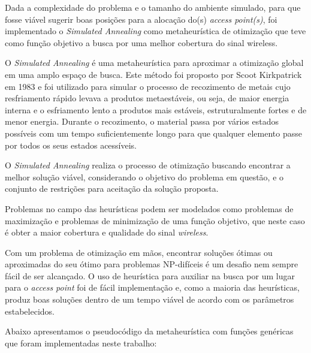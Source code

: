 \documentclass[
	12pt,				%
	openright,			%
	twoside,			%
	a4paper,			%
	english,			%
	french,				%
	spanish,			%
	brazil				%
	]{abntex2}
\begin{document}
Dada a complexidade do problema e o tamanho do ambiente simulado, para que fosse viável sugerir boas posições para a alocação do(s) \textit{access point(s)}, foi implementado o \textit{Simulated Annealing} como metaheurística de otimização que teve como função objetivo a busca por uma melhor cobertura do sinal wireless. 

O \textit{Simulated Annealing} é uma metaheurística para aproximar a otimização global em uma amplo espaço de busca. Este método foi proposto por Scoot Kirkpatrick em 1983 e foi utilizado para simular o processo de recozimento de metais cujo resfriamento  rápido levava a produtos metaestáveis, ou seja, de maior energia interna e o esfriamento lento a produtos mais estáveis, estruturalmente fortes e de menor energia. Durante o recozimento, o material passa por vários estados possíveis com um tempo suficientemente longo para que qualquer elemento passe por todos os seus estados acessíveis.

O \textit{Simulated Annealing} realiza o processo de otimização buscando encontrar a melhor solução viável, considerando o objetivo do problema em questão, e o conjunto de restrições para aceitação da solução proposta.

Problemas no campo das heurísticas podem ser modelados como problemas de maximização e problemas de minimização de uma função objetivo, que neste caso é obter a maior cobertura e qualidade do sinal \textit{wireless}.

Com um problema de otimização em mãos, encontrar soluções ótimas ou aproximadas do seu ótimo para problemas NP-difíceis é um desafio nem sempre fácil de ser alcançado. O uso de heurística para auxiliar na busca por um lugar para o \textit{access point} foi de fácil implementação e, como a maioria das heurísticas, produz boas soluções dentro de um tempo viável de acordo com os parâmetros estabelecidos.

Abaixo apresentamos o pseudocódigo da metaheurística com funções genéricas que foram implementadas neste trabalho:
\end{document}
